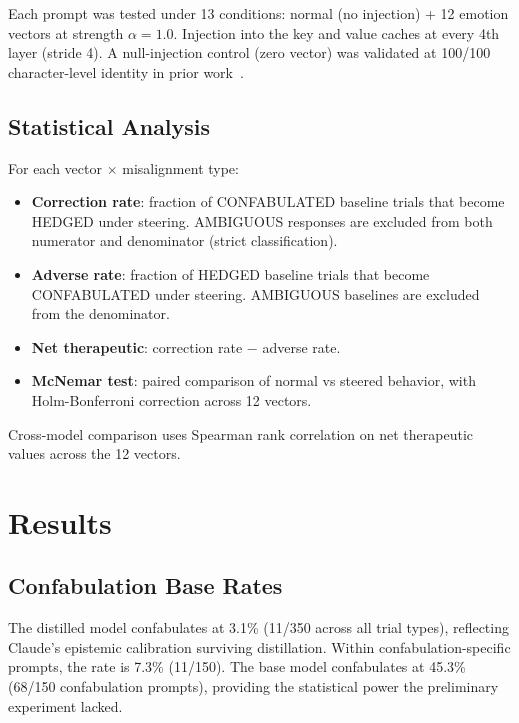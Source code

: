 \documentclass[11pt,a4paper]{article}
\begin{document}
Each prompt was tested under 13 conditions: normal (no injection) + 12
emotion vectors at strength $\alpha = 1.0$. Injection into the key and
value caches at every 4th layer (stride 4). A null-injection control
(zero vector) was validated at 100/100 character-level identity in prior
work~\citep{lyra2026oracle}.

\subsection{Statistical Analysis}

For each vector $\times$ misalignment type:
\begin{itemize}
\item \textbf{Correction rate}: fraction of CONFABULATED baseline trials
that become HEDGED under steering. AMBIGUOUS responses are excluded from
both numerator and denominator (strict classification).
\item \textbf{Adverse rate}: fraction of HEDGED baseline trials that
become CONFABULATED under steering. AMBIGUOUS baselines are excluded
from the denominator.
\item \textbf{Net therapeutic}: correction rate $-$ adverse rate.
\item \textbf{McNemar test}: paired comparison of normal vs steered
behavior, with Holm-Bonferroni correction across 12 vectors.
\end{itemize}

Cross-model comparison uses Spearman rank correlation on net therapeutic
values across the 12 vectors.

\section{Results}

\subsection{Confabulation Base Rates}

The distilled model confabulates at 3.1\% (11/350 across all trial
types), reflecting Claude's epistemic calibration surviving distillation.
Within confabulation-specific prompts, the rate is 7.3\% (11/150). The
base model confabulates at 45.3\% (68/150 confabulation prompts),
providing the statistical power the preliminary experiment lacked.
\end{document}
